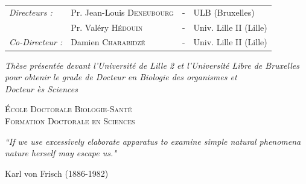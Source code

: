 \documentclass[11pt, oneside]{Thesis} %
\begin{document}
\begin{titlepage}
\begin{center}
\begin{flushleft}
\begin{tabular} {llcl}
	\textit{Directeurs :} & Pr. Jean-Louis \textsc{Deneubourg} & - & ULB (Bruxelles) \\ & Pr. Valéry \textsc{Hédouin} & - & Univ. Lille II (Lille) \\ 
    
    \textit{Co-Directeur :} & Damien \textsc{Charabidzé} & - & Univ. Lille II (Lille)
       
\end{tabular}
\end{flushleft}
	
\large \textit{Thèse présentée devant l'Université de Lille 2 et l'Université Libre de Bruxelles pour obtenir le grade de Docteur en Biologie des organismes et \\ Docteur ès Sciences}\\[0.2cm] %

\begin{flushleft} \large
\groupname %
 
\end{flushleft}

\begin{center}
\textsc{École Doctorale Biologie-Santé \\ Formation Doctorale en Sciences}
\end{center}

\vfill
 \end{center}	
\end{titlepage}

\cleardoublepage




\pagestyle{empty} %

\null\vfill %

\textit{``If we use excessively elaborate apparatus to examine simple natural phenomena nature herself may escape us."}

\begin{flushright}
Karl von Frisch (1886-1982)
\end{flushright}
\end{document}
